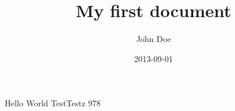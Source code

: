 \documentclass{article}
\title{My first document}
\date{2013-09-01}
\author{John Doe}
\begin{document}
\maketitle
\newpage
{}
Hello World TestTestz
978
\end{document}
